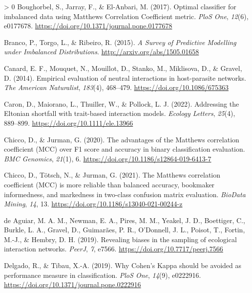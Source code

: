 \documentclass[10pt,oneside]{article}
\newlength{\cslhangindent}
\newenvironment{CSLReferences}[3] %
 {%
  \setlength{\parindent}{0pt}
  \ifodd #1 \everypar{\setlength{\hangindent}{\cslhangindent}}\ignorespaces\fi
  \ifnum #2 > 0
  \setlength{\parskip}{#2\baselineskip}
  \fi
 }%
 {}
\begin{document}
\begin{CSLReferences}{1}{0}
\leavevmode\hypertarget{ref-Boughorbel2017OptCla}{}%
Boughorbel, S., Jarray, F., \& El-Anbari, M. (2017). Optimal classifier
for imbalanced data using Matthews Correlation Coefficient metric.
\emph{PloS One}, \emph{12}(6), e0177678.
\url{https://doi.org/10.1371/journal.pone.0177678}

\leavevmode\hypertarget{ref-Branco2015SurPre}{}%
Branco, P., Torgo, L., \& Ribeiro, R. (2015). \emph{A Survey of
Predictive Modelling under Imbalanced Distributions}.
\url{http://arxiv.org/abs/1505.01658}

\leavevmode\hypertarget{ref-Canard2014EmpEva}{}%
Canard, E. F., Mouquet, N., Mouillot, D., Stanko, M., Miklisova, D., \&
Gravel, D. (2014). Empirical evaluation of neutral interactions in
host-parasite networks. \emph{The American Naturalist}, \emph{183}(4),
468--479. \url{https://doi.org/10.1086/675363}

\leavevmode\hypertarget{ref-Caron2022AddElt}{}%
Caron, D., Maiorano, L., Thuiller, W., \& Pollock, L. J. (2022).
Addressing the Eltonian shortfall with trait-based interaction models.
\emph{Ecology Letters}, \emph{25}(4), 889--899.
\url{https://doi.org/10.1111/ele.13966}

\leavevmode\hypertarget{ref-Chicco2020AdvMat}{}%
Chicco, D., \& Jurman, G. (2020). The advantages of the Matthews
correlation coefficient (MCC) over F1 score and accuracy in binary
classification evaluation. \emph{BMC Genomics}, \emph{21}(1), 6.
\url{https://doi.org/10.1186/s12864-019-6413-7}

\leavevmode\hypertarget{ref-Chicco2021MatCor}{}%
Chicco, D., Tötsch, N., \& Jurman, G. (2021). The Matthews correlation
coefficient (MCC) is more reliable than balanced accuracy, bookmaker
informedness, and markedness in two-class confusion matrix evaluation.
\emph{BioData Mining}, \emph{14}, 13.
\url{https://doi.org/10.1186/s13040-021-00244-z}

\leavevmode\hypertarget{ref-deAguiar2019RevBia}{}%
de Aguiar, M. A. M., Newman, E. A., Pires, M. M., Yeakel, J. D.,
Boettiger, C., Burkle, L. A., Gravel, D., Guimarães, P. R., O'Donnell,
J. L., Poisot, T., Fortin, M.-J., \& Hembry, D. H. (2019). Revealing
biases in the sampling of ecological interaction networks. \emph{PeerJ},
\emph{7}, e7566. \url{https://doi.org/10.7717/peerj.7566}

\leavevmode\hypertarget{ref-Delgado2019WhyCoh}{}%
Delgado, R., \& Tibau, X.-A. (2019). Why Cohen's Kappa should be avoided
as performance measure in classification. \emph{PloS One}, \emph{14}(9),
e0222916. \url{https://doi.org/10.1371/journal.pone.0222916}


\end{CSLReferences}
\end{document}
